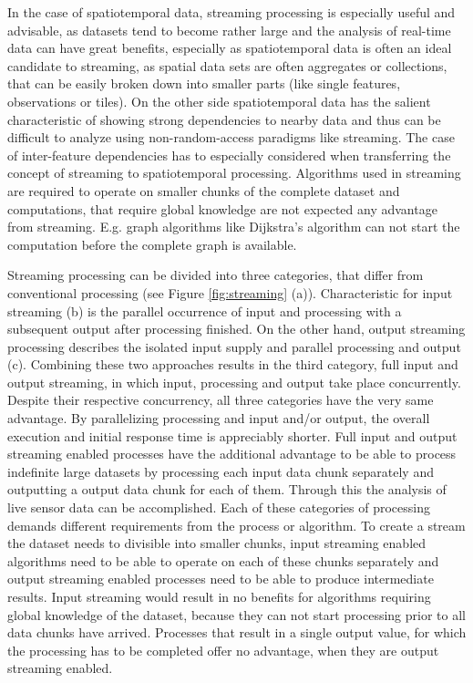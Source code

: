 	In the case of spatiotemporal data, streaming processing is especially useful and advisable, as datasets tend to become rather large and the analysis of real-time data can have great benefits, especially as spatiotemporal data is often an ideal candidate to streaming, as spatial data sets are often aggregates or collections, that can be easily broken down into smaller parts (like single features, observations or tiles). On the other side spatiotemporal data has the salient characteristic of showing strong dependencies to nearby data and thus can be difficult to analyze using non-random-access paradigms like streaming. The case of inter-feature dependencies has to especially considered when transferring the concept of streaming to spatiotemporal processing. Algorithms used in streaming are required to operate on smaller chunks of the complete dataset and computations, that require global knowledge are not expected any advantage from streaming. E.g. graph algorithms like Dijkstra's algorithm \citep{dijkstra} can not start the computation before the complete graph is available.

	Streaming processing can be divided into three categories, that differ from conventional processing (see Figure \ref{fig:streaming} (a)). Characteristic for input streaming (b) is the parallel occurrence of input and processing with a subsequent output after processing finished. On the other hand, output streaming processing describes the isolated input supply and parallel processing and output (c). Combining these two approaches results in the third category, full input and output streaming, in which input, processing and output take place concurrently. Despite their respective concurrency, all three categories have the very same advantage. By parallelizing processing and input and/or output, the overall execution and initial response time is appreciably shorter. Full input and output streaming enabled processes have the additional advantage to be able to process indefinite large datasets by processing each input data chunk separately and outputting a output data chunk for each of them. Through this the analysis of live sensor data can be accomplished.
	Each of these categories of processing demands different requirements from the process or algorithm. To create a stream the dataset needs to divisible into smaller chunks, input streaming enabled algorithms need to be able to operate on each of these chunks separately and output streaming enabled processes need to be able to produce intermediate results. Input streaming would result in no benefits for algorithms requiring global knowledge of the dataset, because they can not start processing prior to all data chunks have arrived. Processes that result in a single output value, for which the processing has to be completed offer no advantage, when they are output streaming enabled.

